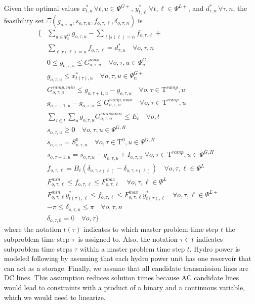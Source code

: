 \documentclass[final]{IEEEtran}
\newcommand{\Tau}{\mathrm{T}}
\begin{document}
Given the optimal values $x_{t, u}^* \, \forall t, u \in \Psi^{G+}$, $y_{t, \ell}^* \, \forall t, \ell \in \Psi^{L+}$, and $d_{\tau, n}^* \, \forall \tau, n$, the feasibility set $\Xi(g_{o, \tau, u}, s_{o, \tau, u}, f_{o, \tau, \ell}, \delta_{o, \tau, n})$ is
\begin{align}
\{ &\sum\limits_{u \in \Psi^G_{n}} g_{o, \tau, u} - \sum\limits_{\ell | s(\ell) = n} f_{o, \tau, \ell} + \nonumber \\
&\sum\limits_{\ell | r(\ell) = n} f_{o, \tau, \ell} = d_{\tau, n}^* \quad \forall o, \tau, n\\
&0 \leq g_{o, \tau, u} \leq G_{o, \tau, u}^{max} \quad \forall o, \tau, u \in \Psi_n^G \\
&g_{o, \tau, u} \leq x_{t(\tau), u}^* \quad \forall o, \tau, u \in \Psi_n^{G+} \\
&G^{ramp,min}_{o, \tau, u} \leq g_{o, \tau + 1, u} - g_{o, \tau, u} \quad \forall o, \tau \in \Tau^{ramp}, u \\
&g_{o, \tau + 1, u} - g_{o, \tau, u} \leq G^{ramp,max}_{o, \tau, u} \quad \forall o, \tau \in \Tau^{ramp}, u \\
&\sum\limits_{\tau \in t} \sum\limits_{u} g_{o, \tau, u} G^{emissions}_{o, \tau, u} \leq E_{t} \quad \forall o, t \\
&s_{o, \tau, u} \geq 0 \quad \forall o, \tau, u \in \Psi^{G, H} \\
&s_{o, \tau, u} = S^0_{o, \tau, u} \quad \forall o, \tau \in \Tau^0, u \in \Psi^{G, H} \\
&s_{o, \tau + 1, u} = s_{o, \tau, u} - g_{o, \tau, u} + I_{o, \tau, u} \, \, \forall o, \tau \in \Tau^{ramp}, u \in \Psi^{G, H} \\
&f_{o, \tau, \ell} = B_\ell (\delta_{o, \tau, s(\ell)} - \delta_{o, \tau, r(\ell)}) \quad \forall o, \tau, \ell \in \Psi^L \\
&F_{o, \tau, \ell}^{min} \leq f_{o, \tau, \ell} \leq F_{o, \tau, \ell}^{max} \quad \forall o, \tau, \ell \in \Psi^L \\
&F_{o, \tau, \ell}^{min} y_{t(\tau), \ell}^* \leq f_{o, \tau, \ell} \leq F_{o, \tau, \ell}^{max} y_{t(\tau), \ell}^* \quad \forall o, \tau, \ell \in \Psi^{L+} \\
&-\pi \leq \delta_{o, \tau, n} \leq \pi \quad \forall o, \tau, n \\
&\delta_{o, \tau, 0} = 0 \quad \forall o, \tau \}
\end{align}
where the notation $t(\tau)$ indicates to which master problem time step $t$ the subproblem time step $\tau$ is assigned to. Also, the notation $\tau \in t$ indicates subproblem time steps $\tau$ within a master problem time step $t$. Hydro power is modeled following \cite{Debia} by assuming that each hydro power unit has one reservoir that can act as a storage. Finally, we assume that all candidate transmission lines are DC lines. This assumption reduces solution times because AC candidate lines would lead to constraints with a product of a binary and a continuous variable, which we would need to linearize.
\end{document}
